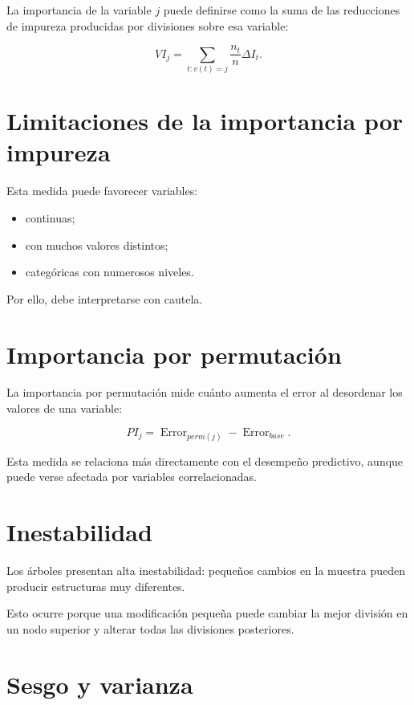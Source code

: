 \documentclass[
  spanish,
  11pt,
  letterpaper,
  DIV=11,
  numbers=noendperiod]{scrreprt}
\providecommand{\tightlist}{%
  \setlength{\itemsep}{0pt}\setlength{\parskip}{0pt}}
\theoremstyle{definition}
\theoremstyle{plain}
\theoremstyle{definition}
\theoremstyle{remark}
\begin{document}
La importancia de la variable \(j\) puede definirse como la suma de las
reducciones de impureza producidas por divisiones sobre esa variable:

\[
VI_j
=
\sum_{t:v(t)=j}
\frac{n_t}{n}
\Delta I_t.
\]

\section{Limitaciones de la importancia por
impureza}\label{limitaciones-de-la-importancia-por-impureza}

Esta medida puede favorecer variables:

\begin{itemize}
\tightlist
\item
  continuas;
\item
  con muchos valores distintos;
\item
  categóricas con numerosos niveles.
\end{itemize}

Por ello, debe interpretarse con cautela.

\section{Importancia por
permutación}\label{importancia-por-permutaciuxf3n}

La importancia por permutación mide cuánto aumenta el error al
desordenar los valores de una variable:

\[
PI_j
=
\operatorname{Error}_{perm(j)}
-
\operatorname{Error}_{base}.
\]

Esta medida se relaciona más directamente con el desempeño predictivo,
aunque puede verse afectada por variables correlacionadas.

\section{Inestabilidad}\label{inestabilidad}

Los árboles presentan alta inestabilidad: pequeños cambios en la muestra
pueden producir estructuras muy diferentes.

Esto ocurre porque una modificación pequeña puede cambiar la mejor
división en un nodo superior y alterar todas las divisiones posteriores.

\section{Sesgo y varianza}\label{sesgo-y-varianza-2}
\end{document}
